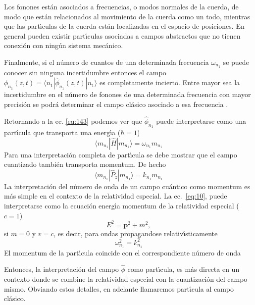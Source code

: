 Los fonones est\'an asociados a frecuencias, o modos normales de la cuerda, de modo que est\'an relacionados al movimiento de la cuerda como un todo, mientras que las part\'\i culas de la cuerda est\'an localizadas en el espacio de posiciones. En general pueden existir part\'\i culas asociadas a campos abstractos que no tienen conexi\'on con ning\'un sistema mec\'anico. 

Finalmente, si el n\'umero de cuantos de una determinada frecuencia $\omega_{n_1}$ se puede conocer sin ninguna incertidumbre entonces el campo $\phi_{n_1}(z,t)=\langle n_1|\hat{\phi}_{n_1}(z,t)|n_1\rangle$ es completamente incierto. Entre mayor sea la incertidumbre en el n\'umero de fonones de una determinada frecuencia con mayor precisi\'on se podr\'a determinar el campo cl\'asico asociado a esa frecuencia \cite{ultimo}.




Retornando a la ec. \eqref{eq:143} podemos ver que $\hat{\phi}_{n_1}$ puede interpretarse como una part\'\i cula que
transporta una energ\'\i a ($\hbar=1$)
\begin{equation}
  \langle m_{n_1}|\hat{H}|m_{n_1}\rangle=\omega_{n_1}m_{n_1}
\end{equation}
Para una interpretaci\'on completa de part\'\i cula se debe mostrar que el
campo cuantizado tambi\'en transporta momentum. De hecho
\begin{equation}
  \langle m_{n_1}|\hat{P}_z|m_{n_1}\rangle=k_{n_1}m_{n_1}
\end{equation}
La interpretaci\'on del n\'umero de onda de un campo cu\'antico como momentum es m\'as simple en el contexto de la relatividad especial.  La ec.~\eqref{eq:10},
puede interpretarse como la ecuaci\'on energ\'\i a momentum de la
relatividad especial ($c=1$)
\begin{equation}
  \label{eq:13}
  E^2=\mathbf{p}^2+m^2,
\end{equation}
si $m=0$ y $v=c$, es decir, para ondas propagandose
relativ\'\i sticamente
\begin{equation}
  \omega_{n_1}^2=k_{n_1}^2
\end{equation}
El momentum de la part\'\i cula coincide con el correspondiente n\'umero de onda

Entonces, la interpretaci\'on del campo $\hat{\phi}$ como part\'\i cula, es m\'as
directa en un contexto donde se combine la relatividad especial con la
cuantizaci\'on del campo mismo. Obviando estos detalles, en adelante
llamaremos part\'\i cula al campo cl\'asico.

